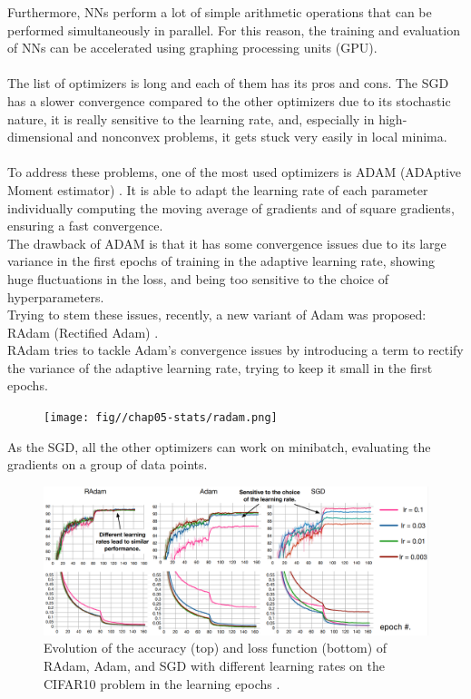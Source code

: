 Furthermore, NNs perform a lot of simple arithmetic operations that can be performed simultaneously in parallel. For this reason, the training and evaluation of NNs can be accelerated using graphing processing units (GPU).\\
\\
The list of optimizers is long and each of them has its pros and cons. The SGD has a slower convergence compared to the other optimizers due to its stochastic nature, it is really sensitive to the learning rate, and, especially in high-dimensional and nonconvex problems, it gets stuck very easily in local minima.\\
\\
To address these problems, one of the most used optimizers is ADAM (ADAptive Moment estimator) \cite{Kingma2014Adam:Optimization}. It is able to adapt the learning rate of each parameter individually computing the moving average of gradients and of square gradients, ensuring a fast convergence.
\\
The drawback of ADAM is that it has some convergence issues due to its large variance in the first epochs of training in the adaptive learning rate, showing huge fluctuations in the loss, and being too sensitive to the choice of hyperparameters.\\
Trying to stem these issues, recently, a new variant of Adam was proposed: RAdam (Rectified Adam) \cite{Liu2019OnBeyond}.\\
RAdam tries to tackle Adam's convergence issues by introducing a term to rectify the variance of the adaptive learning rate, trying to keep it small in the first epochs.

\begin{figure}[H]
    \centering
    \texttt{[image: fig//chap05-stats/radam.png]}
    \label{fig:radam}
\end{figure}
As the SGD, all the other optimizers can work on minibatch, evaluating the gradients on a group of data points.
\begin{figure}[H]
    \centering
    \includegraphics[width=\linewidth]{fig//chap05-stats/radam_loss.png}
    \caption{Evolution of the accuracy (top) and loss function (bottom) of RAdam, Adam, and SGD with different learning rates on the CIFAR10 problem \cite{Ho-Phuoc2018CIFAR10Humans} in the learning epochs \cite{Liu2019OnBeyond}.}
    \label{fig:radam_loss}
\end{figure}
\vspace{-1cm}
